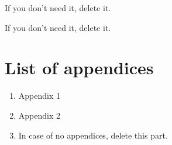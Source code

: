 \documentclass[a4paper,11pt,twoside]{report}
\theoremstyle{definition}
\begin{document}
\listoffigures
\thispagestyle{empty}
If you don't need it, delete it.


\renewcommand{\listtablename}{Spis tabel}
\listoftables
\thispagestyle{empty}
If you don't need it, delete it.

\chapter*{List of appendices}
\begin{enumerate}
\item Appendix 1
\item Appendix 2
\item In case of no appendices, delete this part.
\end{enumerate}
\thispagestyle{empty}
\end{document}
